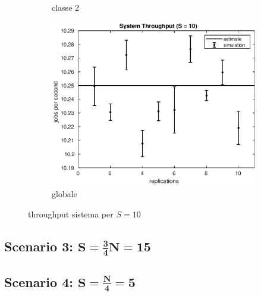 \begin{figure}[!h]
\begin{subfigure}[t]{0.49\textwidth}
\caption{classe 2}
\label{10_x2}
\end{subfigure}
%
\begin{subfigure}[t]{0.5\textwidth}
\includegraphics[width=\textwidth]{figures/simul/10_500K_x}
\caption{globale}
\label{10_x}
\end{subfigure}
%
\caption{throughput sistema per $S = 10$}
\end{figure}
%

%
%
\subsection{Scenario 3: $\mathbf{S=\frac{3}{4}N=15}$}
%
%
\subsection{Scenario 4: $\mathbf{S=\frac{N}{4}=5}$}
